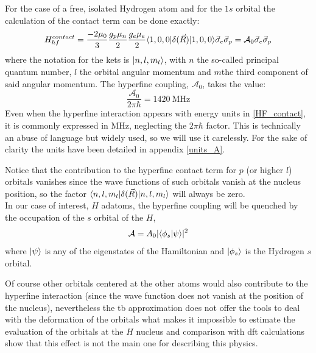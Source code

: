 For the case of a free, isolated Hydrogen atom and for the $1s$ orbital the calculation of the contact term can be done exactly:
\begin{equation}
H^{contact}_{hf} =
\frac{-2\mu_0}{3}\frac{g_{p}\mu_{n}}{2}
\frac{g_{e}\mu_{e}}{2} \langle1,0,0|\delta(\vec{R})
|1,0,0\rangle  \vec{\sigma}_e\vec{\sigma}_p =
\mathcal{A}_{0}\vec{\sigma}_e\vec{\sigma}_p
\label{HF_contact}
\end{equation}
where the notation for the kets is $|n,l,m_{l}\rangle$, with $n$ the so-called principal quantum number, $l$ the orbital angular momentum and $m $the third component of said angular momentum. The hyperfine coupling, $\mathcal{A}_{0}$, takes the value:
\begin{equation}
  \frac{\mathcal{A}_0}{2\pi\hbar} = \SI{1420}{\MHz}
\end{equation}
Even when the hyperfine interaction appears with energy units in \eqref{HF_contact}, it is commonly expressed in $\si{\MHz}$, neglecting the $2\pi\hbar$ factor. This is technically an abuse of language but widely used, so we will use it carelessly. For the sake of clarity the units have been detailed in appendix \ref{units_A}.

Notice that the contribution to the hyperfine contact term for $p$ (or higher $l$) orbitals vanishes since the wave functions of such orbitals vanish at the nucleus position, so the factor $\langle n,l,m_{l}|\delta(\vec{R})|n,l,m_{l}\rangle$ will always be zero.\\

In our case of interest, $H$ adatoms, the hyperfine coupling will be quenched by the occupation of the $s$ orbital of the $H$,
\begin{equation}
  \mathcal{A} = A_0|\langle\phi_s|\psi\rangle|^2
\end{equation}
where $|\psi\rangle$ is any of the eigenstates of the Hamiltonian and $|\phi_s\rangle$ is the Hydrogen $s$ orbital.

Of course other orbitals centered at the other atoms would also contribute to the hyperfine interaction (since the wave function does not vanish at the position of the nucleus), nevertheless the \ac{tb} approximation does not offer the tools to deal with the deformation of the orbitals what makes it impossible to estimate the evaluation of the orbitals at the $H$ nucleus and comparison with \ac{dft} calculations show that this effect is not the main one for describing this physics\cite{Ranjbar2010}.


